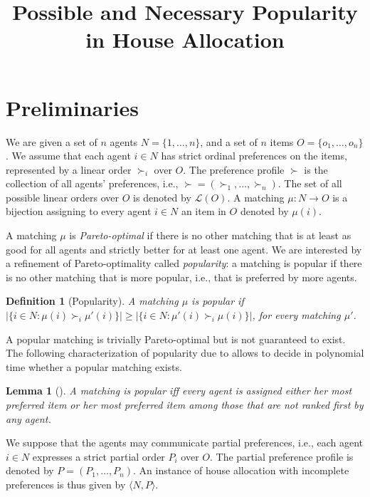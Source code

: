 \documentclass{article}
\title{Possible and Necessary Popularity in House Allocation}
\newtheorem{definition}{Definition}
\newtheorem{lemma}{Lemma}
\newcommand{\match}{\mu}
\newcommand{\linearorders}{\mathcal{L}}
\begin{document}
\maketitle

\section{Preliminaries}

We are given a set of $n$ agents $N = \{1,\dots,n\}$, and a set of $n$ items $O=\{o_1,\dots,o_n\}$.
We assume that each agent $i \in N$ has strict ordinal preferences on the items, represented by a linear order $\succ_i$ over $O$.
The preference profile $\succ$ is the collection of all agents' preferences, i.e., $\succ=(\succ_1,\dots,\succ_n)$.
The set of all possible linear orders over $O$ is denoted by $\linearorders(O)$.
A matching $\match:N\to O$ is a bijection assigning to every agent $i\in N$ an item in $O$ denoted by $\match(i)$.

A matching $\match$ is \emph{Pareto-optimal} if there is no other matching that is at least as good for all agents and strictly better for at least one agent.
We are interested by a refinement of Pareto-optimality called \emph{popularity}: a matching is popular if there is no other matching that is more popular, i.e., that is preferred by more agents.

\begin{definition}[Popularity]
A matching $\match$ is popular if $|\{i\in N: \match(i)\succ_i \match'(i)\}|\geq |\{i\in N: \match'(i)\succ_i \match(i)\}|$, for every matching $\match'$.
\end{definition}

A popular matching is trivially Pareto-optimal but is not guaranteed to exist.
The following characterization of popularity due to \citet{abraham2007popular} allows to decide in polynomial time whether a popular matching exists.

\begin{lemma}[\citet{abraham2007popular}]\label{lem:charact-pop}
A matching is popular iff every agent is assigned either her most preferred item or her most preferred item among those that are not ranked first by any agent.
\end{lemma}

We suppose that the agents may communicate partial preferences, i.e., each agent $i\in N$ expresses a strict partial order $P_i$ over $O$.
The partial preference profile is denoted by $P=(P_1,\dots,P_n)$.
An instance of house allocation with incomplete preferences is thus given by $\langle N,P \rangle$.
\end{document}
